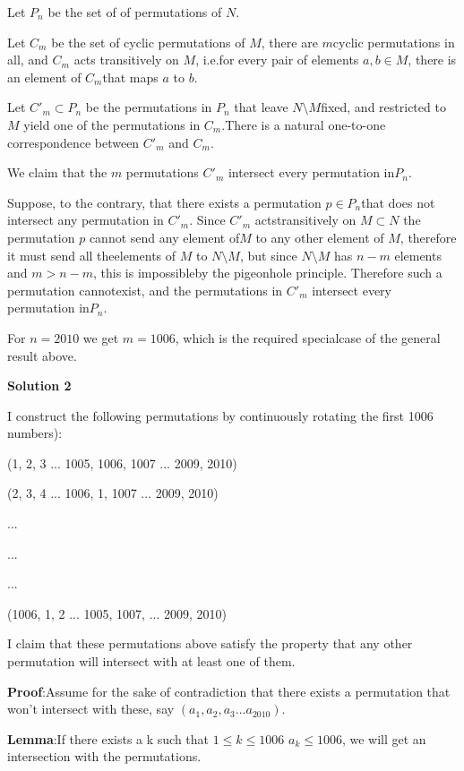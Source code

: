 \begin{enumerate}
 Let $P_n$ be the set of of permutations of $N$.

 Let $C_m$ be the set of cyclic permutations of $M$, there are $m$cyclic permutations in all, and $C_m$ acts transitively on $M$, i.e.for every pair of elements $a,b \in M$, there is an element of $C_m$that maps $a$ to $b$.

 Let $C'_m \subset P_n$ be the permutations in $P_n$ that leave $N\setminus M$fixed, and restricted to $M$ yield one of the permutations in $C_m$.There is a natural one-to-one correspondence between $C'_m$ and $C_m$.

 We claim that the $m$ permutations $C'_m$ intersect every permutation in$P_n$.

 Suppose, to the contrary, that there exists a permutation $p \in P_n$that does not intersect any permutation in $C'_m$. Since $C'_m$ actstransitively on $M \subset N$ the permutation $p$ cannot send any element of$M$ to any other element of $M$, therefore it must send all theelements of $M$ to $N\setminus M$, but since $N\setminus M$ has $n - m$ elements and $m > n - m$, this is impossibleby the pigeonhole principle. Therefore such a permutation cannotexist, and the permutations in $C'_m$ intersect every permutation in$P_n$.

 For $n = 2010$ we get $m = 1006$, which is the required specialcase of the general result above.

 



\textbf{Solution 2}

I construct the following permutations by continuously rotating the first 1006 numbers):

 (1, 2, 3 ... 1005, 1006, 1007 ... 2009, 2010)

 (2, 3, 4 ... 1006, 1, 1007 ... 2009, 2010)

 ...

 ...

 ...

 (1006, 1, 2 ... 1005, 1007, ... 2009, 2010)

 


 I claim that these permutations above satisfy the property that any other permutation will intersect with at least one of them.

 \textbf{Proof}:Assume for the sake of contradiction that there exists a permutation that won't intersect with these, say $(a_1, a_2, a_3 ... a_{2010})$.

 \textbf{Lemma}:If there exists a k such that $1 \leq k \leq 1006$ $a_k \leq 1006$, we will get an intersection with the permutations. 


\end{enumerate}
